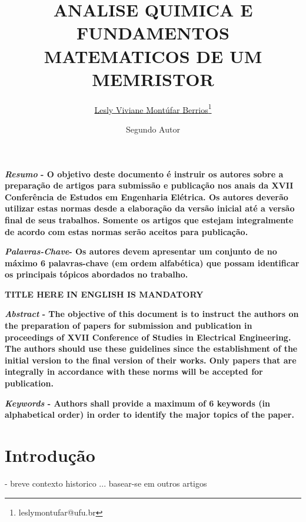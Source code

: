 \documentclass{ceel}
\title{ANALISE QUIMICA E FUNDAMENTOS MATEMATICOS DE UM MEMRISTOR}
\author[1]{\underline{Lesly Viviane Montúfar Berrios}\thanks{leslymontufar@ufu.br}}
\author[1]{Segundo Autor}
\affil[1]{FEELT - Universidade Federal de Uberlândia}
\begin{document}
\inserirtitulo

\begin{multicols}{2}

\textbf{\emph{Resumo} - O objetivo deste documento é instruir os autores sobre a preparação de artigos para submissão e publicação nos anais da XVII Conferência de Estudos em Engenharia Elétrica. Os autores deverão utilizar estas normas desde a elaboração da versão inicial até a versão final de seus trabalhos. Somente os artigos que estejam integralmente de acordo com estas normas serão aceitos para publicação.}
\vspace*{10pt}

\textbf{\emph{Palavras-Chave}- Os autores devem apresentar um conjunto de no máximo 6 palavras-chave (em ordem alfabética) que possam identificar os principais tópicos abordados no trabalho.}


\begin{center}
\noindent\textbf{\large \uppercase{TITLE HERE IN ENGLISH IS MANDATORY}}
\end{center}

\textbf{\emph{Abstract} - The objective of this document is to instruct the authors on the preparation of papers for submission and publication in proceedings of XVII Conference of Studies in Electrical Engineering. The authors should use these guidelines since the establishment of the initial version to the final version of their works. Only papers that are integrally in accordance with these norms will be accepted for publication. }
\vspace*{10pt}

\textbf{\emph{Keywords} - Authors shall provide a maximum of 6 keywords (in alphabetical order) in order to identify the major topics of the paper.}



\section{Introdução}
- breve contexto historico ... basear-se em outros artigos


\end{multicols}
\end{document}
